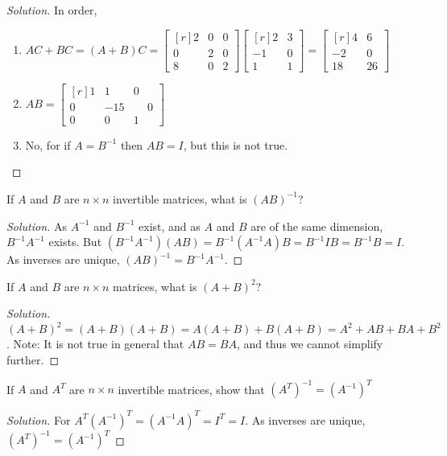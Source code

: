 \documentclass[crop=false,class=book]{standalone}
\begin{document}
\begin{proof}[Solution]
In order,
\begin{enumerate}
    \item $AC+BC = (A+B)C = \begin{bmatrix*}[r] 2 & 0 & 0 \\ 0 & 2 & 0 \\ 8 & 0 & 2 \end{bmatrix*} \begin{bmatrix*}[r] 2 & 3 \\ -1 & 0 \\ 1 & 1 \end{bmatrix*} = \begin{bmatrix*}[r] 4 & 6 \\ -2 & 0 \\ 18 & 26 \end{bmatrix*}$
    \item $AB = \begin{bmatrix*}[r] 1 & 1 & 0 \\ 0 & -15 & \phantom{-}0 \\ 0 & 0 & 1 \end{bmatrix*}$
    \item No, for if $A=B^{-1}$ then $AB=I$, but this is not true.
\end{enumerate}
\end{proof}
\begin{problem}
If $A$ and $B$ are $n\times n$ invertible matrices, what is $(AB)^{-1}$?
\end{problem}
\begin{proof}[Solution]
As $A^{-1}$ and $B^{-1}$ exist, and as $A$ and $B$ are of the same dimension, $B^{-1}A^{-1}$ exists. But $(B^{-1}A^{-1})(AB) = B^{-1}(A^{-1}A)B = B^{-1}IB = B^{-1}B = I$. As inverses are unique, $(AB)^{-1} = B^{-1}A^{-1}$.
\end{proof}
\begin{problem}
If $A$ and $B$ are $n\times n$ matrices, what is $(A+B)^2$?
\end{problem}
\begin{proof}[Solution]
$(A+B)^2 =(A+B)(A+B) = A(A+B)+B(A+B)=A^2+AB+BA+B^2$. Note: It is not true in general that $AB=BA$, and thus we cannot simplify further.
\end{proof}
\begin{problem}
If $A$ and $A^T$ are $n\times n$ invertible matrices, show that $(A^T)^{-1} = (A^{-1})^T$
\end{problem}
\begin{proof}[Solution]
For $A^T(A^{-1})^T = (A^{-1}A)^T = I^T = I$. As inverses are unique, $(A^T)^{-1} = (A^{-1})^T$
\end{proof}
\end{document}
